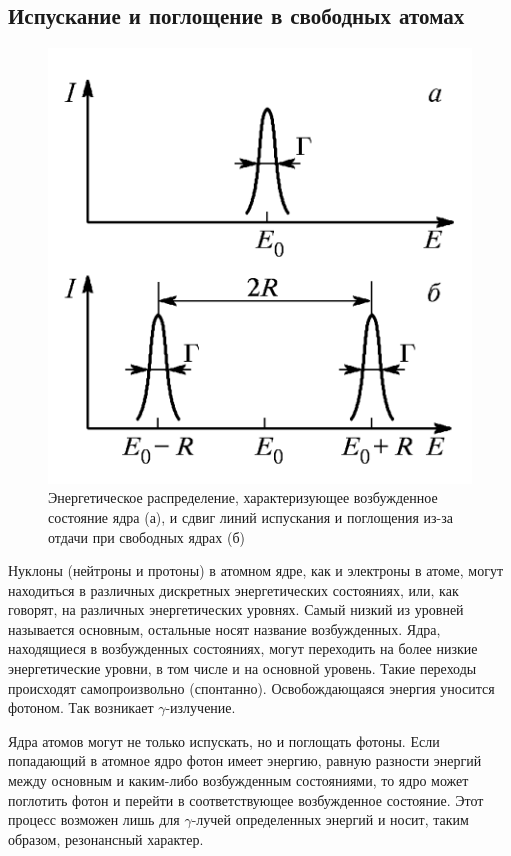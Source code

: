 \documentclass[12pt]{kiarticle} %
\begin{document}
	\subsection{Испускание и поглощение в свободных атомах}
	
	\begin{figure}
		\includegraphics[width=\linewidth]{G}
		\caption{Энергетическое распределение, характеризующее возбужденное состояние ядра (а),
			и сдвиг линий испускания и поглощения из-за отдачи при свободных ядрах (б)}
		\label{ris 1}
	\end{figure}
	
	Нуклоны (нейтроны и протоны) в атомном ядре, как и электроны
	в атоме, могут находиться в различных дискретных энергетических
	состояниях, или, как говорят, на различных энергетических уровнях.
	Самый низкий из уровней называется основным, остальные носят название возбужденных. Ядра, находящиеся в возбужденных состояниях, могут переходить на более низкие энергетические уровни, в том
	числе и на основной уровень. Такие переходы происходят самопроизвольно (спонтанно). Освобождающаяся энергия уносится фотоном.
	Так возникает $ \gamma $-излучение.
	
	Ядра атомов могут не только испускать, но и поглощать фотоны. Если попадающий в атомное ядро фотон имеет
	энергию, равную разности энергий между основным и каким-либо возбужденным состояниями, то ядро может поглотить фотон и перейти в соответствующее возбужденное состояние. Этот процесс возможен лишь для $ \gamma $-лучей определенных энергий и носит, таким образом, резонансный характер.
	
\end{document}
